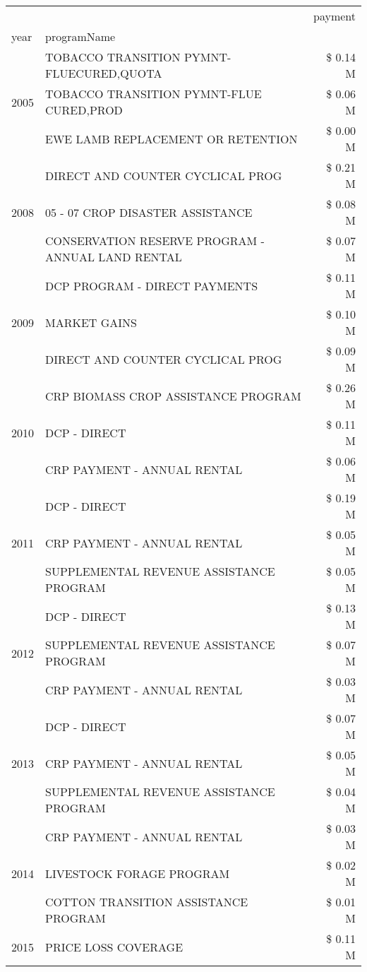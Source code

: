 \begin{tabular}{llr}
\toprule
 &  & payment \\
year & programName &  \\
\midrule
\multirow[t]{3}{*}{2005} & TOBACCO TRANSITION PYMNT-FLUECURED,QUOTA & \$ 0.14 M \\
 & TOBACCO TRANSITION PYMNT-FLUE CURED,PROD & \$ 0.06 M \\
 & EWE LAMB REPLACEMENT OR RETENTION & \$ 0.00 M \\
\cline{1-3}
\multirow[t]{3}{*}{2008} & DIRECT AND COUNTER CYCLICAL PROG & \$ 0.21 M \\
 & 05 - 07 CROP DISASTER ASSISTANCE & \$ 0.08 M \\
 & CONSERVATION RESERVE PROGRAM - ANNUAL LAND RENTAL & \$ 0.07 M \\
\cline{1-3}
\multirow[t]{3}{*}{2009} & DCP PROGRAM - DIRECT PAYMENTS & \$ 0.11 M \\
 & MARKET GAINS & \$ 0.10 M \\
 & DIRECT AND COUNTER CYCLICAL PROG & \$ 0.09 M \\
\cline{1-3}
\multirow[t]{3}{*}{2010} & CRP BIOMASS CROP ASSISTANCE PROGRAM & \$ 0.26 M \\
 & DCP - DIRECT & \$ 0.11 M \\
 & CRP PAYMENT - ANNUAL RENTAL & \$ 0.06 M \\
\cline{1-3}
\multirow[t]{3}{*}{2011} & DCP - DIRECT & \$ 0.19 M \\
 & CRP PAYMENT - ANNUAL RENTAL & \$ 0.05 M \\
 & SUPPLEMENTAL REVENUE ASSISTANCE PROGRAM & \$ 0.05 M \\
\cline{1-3}
\multirow[t]{3}{*}{2012} & DCP - DIRECT & \$ 0.13 M \\
 & SUPPLEMENTAL REVENUE ASSISTANCE PROGRAM & \$ 0.07 M \\
 & CRP PAYMENT - ANNUAL RENTAL & \$ 0.03 M \\
\cline{1-3}
\multirow[t]{3}{*}{2013} & DCP - DIRECT & \$ 0.07 M \\
 & CRP PAYMENT - ANNUAL RENTAL & \$ 0.05 M \\
 & SUPPLEMENTAL REVENUE ASSISTANCE PROGRAM & \$ 0.04 M \\
\cline{1-3}
\multirow[t]{3}{*}{2014} & CRP PAYMENT - ANNUAL RENTAL & \$ 0.03 M \\
 & LIVESTOCK FORAGE PROGRAM & \$ 0.02 M \\
 & COTTON TRANSITION ASSISTANCE PROGRAM & \$ 0.01 M \\
\cline{1-3}
\multirow[t]{3}{*}{2015} & PRICE LOSS COVERAGE & \$ 0.11 M \\

\end{tabular}
